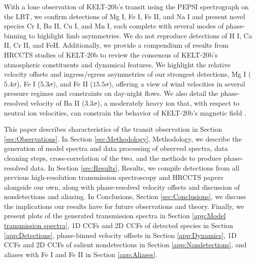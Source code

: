 \documentclass[twocolumn]{aastex631}
\begin{document}
      

        With a lone observation of KELT-20b's transit using the PEPSI spectrograph on the LBT, we confirm detections of Mg I, Fe I, Fe II, and Na I and present novel species Cr I, Ba II, Cu I, and Mn I, each complete with several modes of phase-binning to highlight limb asymmetries. We do not reproduce detections of H I, Ca II, Cr II, and FeH. Additionally, we provide a compendium of results from HRCCTS studies of KELT-20b to review the consensus of KELT-20b's atmospheric constituents and dynamical features. We highlight the relative velocity offsets and ingress/egress asymmetries of our strongest detections, Mg I ($5.4\sigma$), Fe I ($5.3\sigma$), and Fe II ($15.5\sigma$), offering a view of wind velocities in several pressure regimes and constraints on day-night flows. We also detail the phase-resolved velocity of Ba II ($3.3\sigma$), a moderately heavy ion that, with respect to neutral ion velocities, can constrain the behavior of KELT-20b's magnetic field \citep{Savel2024}. 

        This paper describes characteristics of the transit observation in Section \ref{sec:Observations}. In Section \ref{sec:Methodology}, Methodology, we describe the generation of model spectra and data processing of observed spectra, data cleaning steps, cross-correlation of the two, and the methods to produce phase-resolved data. In Section \ref{sec:Results}, Results, we compile detections from all previous high-resolution transmission spectroscopy and HRCCTS papers alongside our own, along with phase-resolved velocity offsets and discussion of nondetections and aliasing. In Conclusions, Section \ref{sec:Conclusions}, we discuss the implications our results have for future observations and theory. Finally, we present plots of the generated transmission spectra in Section \ref{app:Model transmission spectra}, 1D CCFs and 2D CCFs of detected species in Section \ref{app:Detections}, phase-binned velocity offsets in Section \ref{app:Dynamics}, 1D CCFs and 2D CCFs of salient nondetections in Section \ref{app:Nondetections}, and aliases with Fe I and Fe II in Section \ref{app:Aliases}.
        
\end{document}
